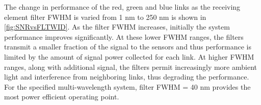The change in performance of the red, green and blue links as the receiving element filter FWHM is varied from 1 nm to 250 nm is shown in \figurename{\ref{fig:SNRvsFLTWID}}. As the filter FWHM increases, initially the system performance improves significantly. At these lower FWHM ranges, the filters transmit a smaller fraction of the signal to the sensors and thus performance is limited by the amount of signal power collected for each link. At higher FWHM ranges, along with additional signal, the filters permit increasingly more ambient light and interference from neighboring links, thus degrading the performance. For the specified multi-wavelength system, filter FWHM = 40 nm provides the most power efficient operating point.









